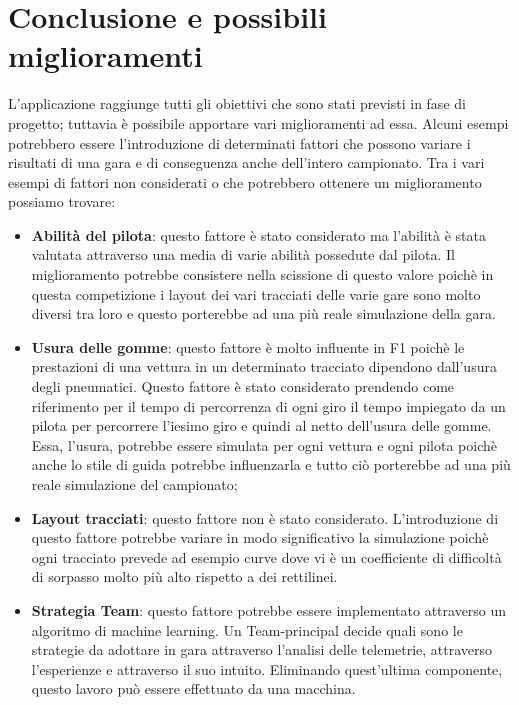 \chapter{Conclusione e possibili miglioramenti}
\label{sec:Conclusione e possibili miglioramenti}

L'applicazione raggiunge tutti gli obiettivi che sono stati previsti in fase di progetto; tuttavia è possibile apportare vari miglioramenti ad essa. Alcuni esempi potrebbero essere l'introduzione di determinati fattori che possono variare i risultati di una gara e di conseguenza anche dell'intero campionato. Tra i vari esempi di fattori non considerati o che potrebbero ottenere un miglioramento possiamo trovare:
\begin{itemize}

    \item\textbf{Abilità del pilota}: questo fattore è stato considerato ma l'abilità è stata valutata attraverso una media di varie abilità possedute dal pilota. Il miglioramento potrebbe consistere nella scissione di questo valore poichè in questa competizione i layout dei vari tracciati delle varie gare sono molto diversi tra loro e questo porterebbe ad una più reale simulazione della gara. 
    \item \textbf{Usura delle gomme}: questo fattore è molto influente in F1 poichè le prestazioni di una vettura in un determinato tracciato dipendono dall'usura degli pneumatici. Questo fattore è stato considerato prendendo come riferimento per il tempo di percorrenza di ogni giro il tempo impiegato da un pilota per percorrere l'iesimo giro e quindi al netto dell'usura delle gomme. Essa, l'usura, potrebbe essere simulata per ogni vettura e ogni pilota poichè anche lo stile di guida potrebbe influenzarla e tutto ciò porterebbe ad una più reale simulazione del campionato;
    \item \textbf{Layout tracciati}: questo fattore non è stato considerato. L'introduzione di questo fattore potrebbe variare in modo significativo la simulazione poichè ogni tracciato prevede ad esempio curve dove vi è un coefficiente di difficoltà di sorpasso molto più alto rispetto a dei rettilinei.\clearpage
    \item \textbf{Strategia Team}: questo fattore potrebbe essere implementato attraverso un algoritmo di machine learning. Un Team-principal decide quali sono le strategie da adottare in gara attraverso l'analisi delle telemetrie, attraverso l'esperienze e attraverso il suo intuito. Eliminando quest'ultima componente, questo lavoro può essere effettuato da una macchina.
\end{itemize}
